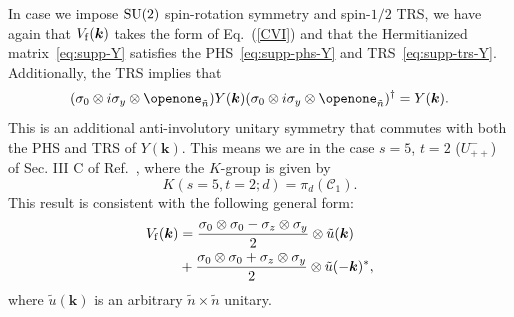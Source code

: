 \documentclass[prl,twocolumn,preprintnumbers,superscriptaddress,amsmath,amssymb]{revtex4-1}
\begin{document}
In case we impose ${\rm SU}(2)$ spin-rotation symmetry and spin-$1/2$ TRS, we have again that $V_{\rm f}(\boldsymbol{k})$ takes the form of Eq.~(\ref{CVI}) and that the Hermitianized matrix~\eqref{eq:supp-Y} satisfies the PHS~\eqref{eq:supp-phs-Y} and TRS~\eqref{eq:supp-trs-Y}. Additionally, the TRS implies that
\begin{equation}
    (\sigma_0\otimes i\sigma_y \otimes \openone_{\tilde n}) Y(\boldsymbol{k})(\sigma_0\otimes i\sigma_y \otimes \openone_{\tilde n})^\dag = Y(\boldsymbol{k}).
\end{equation}
This is an additional anti-involutory unitary symmetry that commutes with both the PHS and TRS of $Y(\boldsymbol{k})$. This means we are in the case $s=5$, $t=2$ ($U^-_{++}$) of Sec. III C of Ref.~\cite{Shiozaki2014}, where the $K$-group is given by
\begin{equation}
    K(s=5,t=2;d)=\pi_d(\mathcal{C}_1).
\end{equation}
This result is consistent with the following general form:
\begin{equation}
\begin{split}
V_{\rm f}(\boldsymbol{k})&=\frac{\sigma_0\otimes\sigma_0- \sigma_z\otimes\sigma_y}{2}\otimes\tilde{u}(\boldsymbol{k}) \\
&+ \frac{\sigma_0\otimes\sigma_0 + \sigma_z\otimes\sigma_y}{2}\otimes\tilde{u}(-\boldsymbol{k})^* ,
\end{split}
\label{CIV}
\end{equation}
where $\tilde{u}(\boldsymbol{k})$ is an arbitrary $\tilde n \times \tilde n$ unitary.
\end{document}
